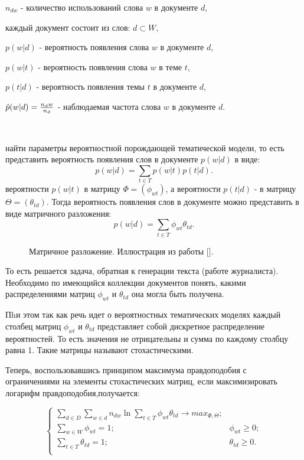  $n_{dw}$ - количество использований слова $w$ в документе $d$,

 каждый документ состоит из слов: $d \subset W$,

 $p(w|d)$ - вероятность появления слова $w$ в документе $d$,

 $p(w|t)$ - вероятность появления слова $w$ в теме $t$,

 $p(t|d)$ - вероятность появления темы $t$ в документе $d$,

 $\hat{p}(w|d) = {{n_dw}\over{n_d}}$ - наблюдаемая частота слова $w$ в документе $d$.

~\

 найти параметры вероятностной порождающей тематической модели, то есть представить вероятность появления слов в документе $p(w|d)$ в виде:
\begin{equation}
p(w|d) = \sum_{t \in T}{ p(w|t) p(t|d) }.
\end{equation}
 вероятности $p(w|t)$ в матрицу $\Phi=(\phi_{wt})$, а вероятности $p(t|d)$ - в матрицу $\Theta=(\theta_{td})$. Тогда вероятность появления слов в документе можно представить в виде матричного разложения:
\begin{equation}
p(w|d) = \sum_{t \in T}{ \phi_{wt} \theta_{td} }.
\end{equation}

\begin{figure}[h]
\caption{Матричное разложение. Иллюстрация из работы [].}
\label{fig:image}
\end{figure}
\todo{}

То есть решается задача, обратная к генерации текста (работе журналиста). Необходимо по имеющийся коллекции документов понять, какими распределениями матриц $\phi_{wt}$ и $\theta_{td}$ она могла быть получена.

Пhи этом так как речь идет о вероятностных тематических моделях каждый столбец матриц $\phi_{wt}$ и $\theta_{td}$ представляет собой дискретное распределение вероятностей. То есть значения не отрицательны и сумма по каждому столбцу равна 1. Такие матрицы называют стохастическими.

Теперь, воспользовавшись принципом максимума правдоподобия с ограничениями на элементы стохастических матриц, если максимизировать  логарифм правдоподобия,получается:

\begin{equation}
\begin{cases}
    \sum_{d \in D} \sum_{w \in d} n_{dw} \ln{\sum_{t \in T} \phi_{wt} \theta_{td} } \rightarrow max_{\Phi,\Theta};\\
    \sum_{w \in W}\phi_{wt} = 1; &\phi_{wt} \ge 0;\\
    \sum_{t \in T}\theta_{td} = 1; &\theta_{td} \ge 0.\\
\end{cases}
\end{equation}

